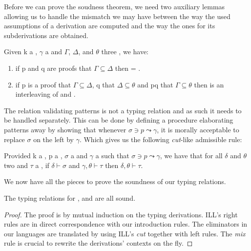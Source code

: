 Before we can prove the soudness theorem, we need two auxiliary lemmas allowing
us to handle the mismatch we may have between the way the used assumptions of a
derivation are computed and the way the ones for its subderivations are obtained.

\begin{lemma}Given k a \Nat{}, \ensuremath{\gamma} a  and \ensuremath{\Gamma}, \ensuremath{\Delta}, and \ensuremath{\theta} three \Usages{\ensuremath{\gamma}},
we have:\begin{enumerate}
\item if p and q are proofs that $\ensuremath{\Gamma} \ensuremath{\subseteq} \ensuremath{\Delta}$ then  = .
\item if p is a proof that $\ensuremath{\Gamma} \ensuremath{\subseteq} \ensuremath{\Delta}$, q that $\ensuremath{\Delta} \ensuremath{\subseteq} \ensuremath{\theta}$ and pq that $\ensuremath{\Gamma} \ensuremath{\subseteq} \ensuremath{\theta}$ then 
is an interleaving of  and .
\end{enumerate}
\end{lemma}

The relation validating patterns is not a typing relation and as such it needs
to be handled separately. This can be done by defining a procedure elaborating
patterns away by showing that whenever $\ensuremath{\sigma} \ensuremath{\ni} p \leadsto{} \ensuremath{\gamma}$, it is morally
acceptable to replace \ensuremath{\sigma} on the left by \ensuremath{\gamma}. Which gives us the following \textit{cut}-like
admissible rule:

\begin{lemma} Provided k a \Nat{}, p a ,
\ensuremath{\sigma} a \Type{} and \ensuremath{\gamma} a  such that $\ensuremath{\sigma} \ensuremath{\ni} p \leadsto{} \ensuremath{\gamma}$, we have that for
all \ensuremath{\delta} and \ensuremath{\theta} two \List{\Type} and \ensuremath{\tau} a \Type{}, if $\ensuremath{\delta} \ensuremath{\vdash} \ensuremath{\sigma}$ and $\ensuremath{\gamma} , \ensuremath{\theta} \ensuremath{\vdash} \ensuremath{\tau}$ then $\ensuremath{\delta} , \ensuremath{\theta} \ensuremath{\vdash} \ensuremath{\tau}$.
\end{lemma}

We now have all the pieces to prove the soundness of our typing relations.

\begin{theorem}[Soundness]The typing relations for \Var{}, \Inferable{}
and \Checkable{} are all sound.
\end{theorem}
\begin{proof}
The proof is by mutual induction on the typing derivations. ILL's right
rules are in direct correspondence with our introduction rules. The
eliminators in our languages are translated by using ILL's \textit{cut}
together with left rules. The \textit{mix} rule is crucial to rewrite
the derivations' contexts on the fly.
\end{proof}

